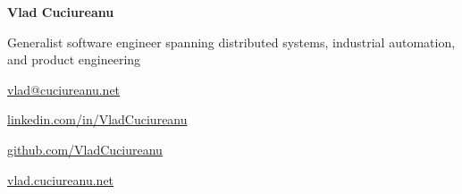 \noindent
\begin{minipage}[b]{\leftcolwidth}%
  {\fontsize{34}{36}\selectfont\bfseries\color{accent}Vlad Cuciureanu}%
  \par\vspace{6pt}%
  {\fontsize{8}{10}\selectfont\color{body}%
    Generalist software engineer spanning distributed systems, industrial automation, and product engineering}%
\end{minipage}%
\hspace{\colgap}%
\begin{minipage}[b]{\rightcolwidth}%
  {\fontsize{8}{11}\selectfont\color{body}%
    \href{mailto:vlad@cuciureanu.net}{vlad@cuciureanu.net}\par
    \href{https://www.linkedin.com/in/VladCuciureanu}{linkedin.com/in/VladCuciureanu}\par
    \href{https://github.com/VladCuciureanu}{github.com/VladCuciureanu}\par
    \href{https://vlad.cuciureanu.net}{vlad.cuciureanu.net}}%
\end{minipage}
